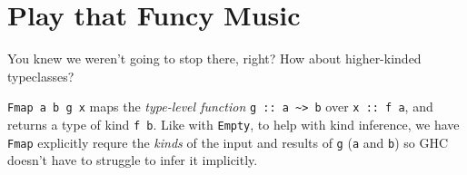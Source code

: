 \documentclass[]{article}
\newenvironment{Shaded}{}{}
\newcommand{\KeywordTok}[1]{\textcolor[rgb]{0.00,0.44,0.13}{\textbf{{#1}}}}
\newcommand{\DataTypeTok}[1]{\textcolor[rgb]{0.56,0.13,0.00}{{#1}}}
\newcommand{\CommentTok}[1]{\textcolor[rgb]{0.38,0.63,0.69}{\textit{{#1}}}}
\newcommand{\OtherTok}[1]{\textcolor[rgb]{0.00,0.44,0.13}{{#1}}}
\newcommand{\FunctionTok}[1]{\textcolor[rgb]{0.02,0.16,0.49}{{#1}}}
\newcommand{\NormalTok}[1]{{#1}}
\begin{document}
\section{Play that Funcy Music}\label{play-that-funcy-music}

You knew we weren't going to stop there, right? How about higher-kinded
typeclasses?

\begin{Shaded}
\end{Shaded}

\texttt{Fmap\ a\ b\ g\ x} maps the \emph{type-level function}
\texttt{g\ ::\ a\ \textasciitilde{}\textgreater{}\ b} over \texttt{x\ ::\ f\ a},
and returns a type of kind \texttt{f\ b}. Like with \texttt{Empty}, to help with
kind inference, we have \texttt{Fmap} explicitly requre the \emph{kinds} of the
input and results of \texttt{g} (\texttt{a} and \texttt{b}) so GHC doesn't have
to struggle to infer it implicitly.
\end{document}

